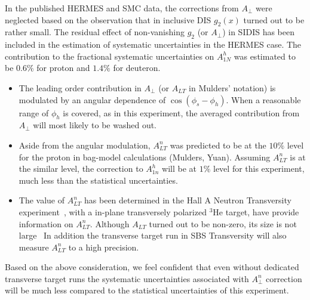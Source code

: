 In the published HERMES and SMC data, the corrections from $A_{\perp}$ were neglected based on
the observation that in inclusive DIS $g_2(x)$ turned out to be rather small.  The residual
effect of non-vanishing $g_2$ (or $A_{\perp}$) in SIDIS has been included in the 
estimation of systematic uncertainties in the HERMES case. The contribution to the fractional 
systematic uncertainties on $A_{1N}^h$ was estimated to be $0.6 \%$ for proton and 
$1.4 \%$ for deuteron.


\begin{itemize}
    \item  The leading order contribution in $A_{\perp}$ (or $A_{LT}$ in Mulders' notation)  
           is modulated by an angular dependence of $ \cos(\phi_s - \phi_h)$.
           When a reasonable range of $\phi_h$ is covered,  as in this experiment, 
           the averaged contribution from $A_{\perp}$ will most likely to be washed out.
 
    \item  Aside from the angular modulation, $A^n_{LT}$  was predicted to be at 
           the $10 \%$ level for the proton in bag-model calculations (Mulders, Yuan).
           Assuming $A^n_{LT}$ is at the similar level, the correction to $A_{1n}^h$
           will be at $1 \%$ level for this experiment, much less than the 
           statistical uncertainties.    
             
    \item  The value of $A^n_{LT}$ has been determined in the Hall A Neutron
           Transversity experiment~\cite{E06010_ALT_PRL}, with a in-plane transversely polarized $^3$He target, have provide
            information on $A^n_{LT}$.    Although $A_{LT}$ turned out to be non-zero,  its size is not large~\cite{E06010_ALT_PRL}
            In addition the transverse target run in SBS Transversity will also measure $A^n_{LT}$ to a high precision.
\end{itemize}  

Based on the above consideration,  we feel confident that 
even without dedicated transverse target runs the systematic 
uncertainties associated with $A^n_{\perp}$ correction 
will be much less compared to the statistical uncertainties of this experiment. 

